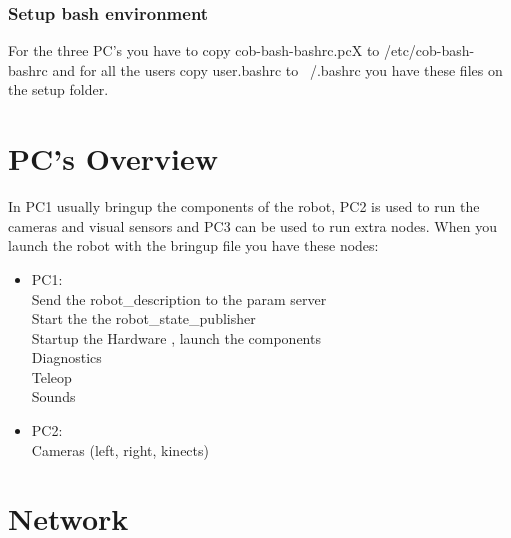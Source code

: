 \subsubsection{Setup bash environment}
For the three PC's you have to copy cob-bash-bashrc.pcX to /etc/cob-bash-bashrc and for all the users copy user.bashrc to \ /.bashrc you have these files on the setup folder.

\section{PC's Overview}
In PC1 usually bringup the components of the robot, PC2 is used to run the cameras and visual sensors and PC3 can be used to run extra nodes.
When you launch the robot with the bringup file you have these nodes:
\begin{itemize}
\item PC1:
\\ Send the robot\_description to the param server
\\ Start the the robot\_state\_publisher
\\Startup the Hardware , launch the components
\\ Diagnostics
\\ Teleop
\\ Sounds
 \item PC2:
\\ Cameras (left, right, kinects)
\end{itemize}
\section{Network} 

